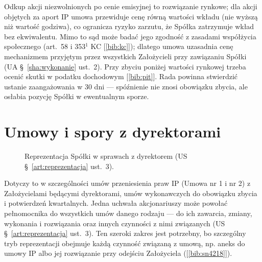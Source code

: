 \documentclass[11pt,a4paper]{report}
\newcommand{\Zr}[1]{[\ref{bib:#1}]}
\begin{document}
\begin{Komentarz}
Odkup akcji niezwolnionych po cenie emisyjnej to rozwiązanie rynkowe; dla akcji objętych za aport IP umowa przewiduje cenę równą wartości wkładu (nie wyższą niż wartość godziwa), co ogranicza ryzyko zarzutu, że Spółka zatrzymuje wkład bez ekwiwalentu. Mimo to sąd może badać jego zgodność z zasadami współżycia społecznego (art.~58 i 353$^{1}$ KC \Zr{kc}); dlatego umowa uzasadnia cenę mechanizmem przyjętym przez wszystkich Założycieli przy zawiązaniu Spółki (UA §~\ref{sha:wykonanie} ust.~2). Przy zbyciu poniżej wartości rynkowej trzeba ocenić skutki w podatku dochodowym \Zr{pit}. Rada powinna stwierdzić ustanie zaangażowania w 30 dni --- spóźnienie nie znosi obowiązku zbycia, ale osłabia pozycję Spółki w ewentualnym sporze.
\end{Komentarz}

\section{Umowy i spory z dyrektorami}

\begin{figure}[H]
\centering
{}
\caption{Reprezentacja Spółki w sprawach z dyrektorem (US §~\ref{art:reprezentacja} ust.~3).}
\end{figure}

Dotyczy to w szczególności umów przeniesienia praw IP (Umowa nr 1 i nr 2) z Założycielami będącymi dyrektorami, umów wykonawczych do obowiązku zbycia i potwierdzeń kwartalnych. Jedna uchwała akcjonariuszy może powołać pełnomocnika do wszystkich umów danego rodzaju --- do ich zawarcia, zmiany, wykonania i rozwiązania oraz innych czynności z nimi związanych (US §~\ref{art:reprezentacja} ust.~3). Ten szeroki zakres jest potrzebny, bo szczególny tryb reprezentacji obejmuje każdą czynność związaną z umową, np. aneks do umowy IP albo jej rozwiązanie przy odejściu Założyciela (\Zr{sn4218}).
\end{document}
